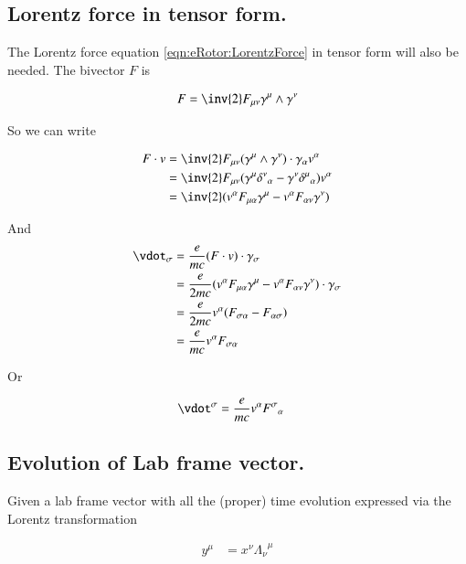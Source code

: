 \subsection{Lorentz force in tensor form. }

The Lorentz force equation \ref{eqn:eRotor:LorentzForce} in tensor form will also be needed.  The bivector $F$ is

\begin{align*}
F = \inv{2} F_{\mu\nu} \gamma^\mu \wedge \gamma^\nu
\end{align*}

So we can write

\begin{align*}
F \cdot v 
&= \inv{2} F_{\mu\nu} (\gamma^\mu \wedge \gamma^\nu) \cdot \gamma_\alpha v^\alpha \\
&= \inv{2} F_{\mu\nu} (\gamma^\mu {\delta^\nu}_\alpha - \gamma^\nu {\delta^\mu}_\alpha) v^\alpha \\
&= \inv{2} (v^\alpha F_{\mu\alpha} \gamma^\mu -v^\alpha F_{\alpha\nu} \gamma^\nu )
\end{align*}

And
\begin{align*}
\vdot_\sigma 
&= \frac{e}{m c} ( F \cdot v ) \cdot \gamma_\sigma \\
&= \frac{e}{2 m c} (v^\alpha F_{\mu\alpha} \gamma^\mu -v^\alpha F_{\alpha\nu} \gamma^\nu ) \cdot \gamma_\sigma \\
&= \frac{e}{2 m c} v^\alpha ( F_{\sigma\alpha} - F_{\alpha\sigma} ) \\
&= \frac{e}{m c} v^\alpha F_{\sigma\alpha} \\
\end{align*}

Or

\begin{align}
\vdot^\sigma &= \frac{e}{m c} v^\alpha {F^\sigma}_\alpha 
\end{align}

\subsection{Evolution of Lab frame vector. }

Given a lab frame vector with all the (proper) time evolution expressed via the Lorentz transformation

\begin{align*}
y^\mu 
&= x^\nu {\Lambda_\nu}^\mu \\
\end{align*}

